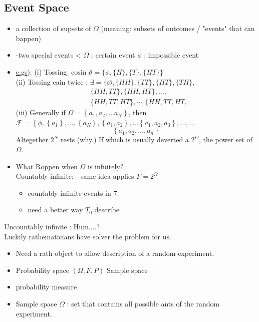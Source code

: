 \subsection{Event Space}
\begin{itemize}
  \item[-] a collection of supsets of \(\Omega\) (meaning: subsets of outcomes / "events" that can bappen)
  \item[] -two special events < \(\Omega\) : certain event \(\phi\) : impossible event
  \item[-] \href{http://e.gs}{e.gs}): (i) Tossing \(\operatorname{cosin} \vartheta=\{\phi,\{H\},\{T\},\{H T\}\}\)\\
(ii) Tossing cain twice : \(\exists=\{\varnothing,\{H H\},\{T T\},\{H T\},\{T H\}\),
\[
\begin{aligned}
& \{H H, T T\},\{H H, H T\}, \ldots, \\
& \{H H, T T, H T\}, \cdots,\{H H, T T, H T,
\end{aligned}
\]
(iii) Generally if \(\Omega=\left\{a_{1}, a_{2}, \ldots a_{N}\right\}\), then \(\mathcal{F}=\left\{\phi,\left\{a_{1}\right\}, \ldots,\left\{a_{N}\right\},\left\{a_{1}, a_{2}\right\}, \ldots\left\{a_{1}, a_{2}, a_{3}\right\}, \ldots, \ldots\right.\)
\[
\left\{a_{1}, a_{2}, \ldots, a_{n}\right\}
\]
Altegether \(2^{N}\) rests (why.) If which is usually deverted a \(2^{\Omega}\), the power set of \(\Omega\).
  \item[-] What Roppen when \(\Omega\) is infuitely?\\
Countably infinite: - same idea applies \(F=2^{\Omega}\)
  \begin{itemize}
    \item[-] countably infinite events in 7.
    \item[-] need a better way \(T_{0}\) describe
  \end{itemize}
\end{itemize}

Uncountably infinite : Hum....?\\
Luckily rathematicians have solver the problem for us.

\begin{itemize}
  \item[-] Need a rath object to allow description of a random experiment.
  \item[-] Probability space \((\Omega, F, P)\) Sample space
  \item[] probability measure
  \item[-] Sample space \(\Omega\) : set that contains all possible ants of the random experiment.
\end{itemize}
